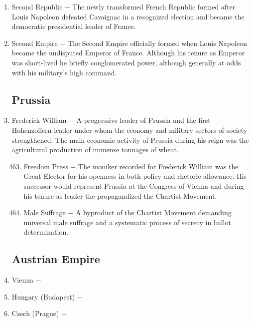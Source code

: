 \documentclass[12pt]{article}
\begin{document}
\begin{enumerate}
\item Second Republic $-$ The newly transformed French Republic formed after Louis Napoleon defeated Cavaignac in a recognized election and became the democratic presidential leader of France.

\item Second Empire $-$ The Second Empire officially formed when Louis Napoleon became the undisputed Emperor of France. Although his tenure as Emperor was short-lived he briefly conglomerated power, although generally at odds with his military's high command.

\subsection{Prussia}

\item Frederick William $-$ A progressive leader of Prussia and the first Hohenzollern leader under whom the economy and military sectors of society strengthened. The main economic activity of Prussia during his reign was the agricultural production of immense tonnages of wheat.

\begin{enumerate}[label=\arabic{*}.]
\setcounter{enumii}{462}

\item Freedom Press $-$ The moniker recorded for Frederick William was the Great Elector for his openness in both policy and rhetoric allowance. His successor would represent Prussia at the Congress of Vienna and during his tenure as leader the propagandized the Chartist Movement.

\item Male Suffrage $-$ A byproduct of the Chartist Movement demanding universal male suffrage and a systematic process of secrecy in ballot determination.

\end{enumerate}
\setcounter{enumi}{464}

\subsection{Austrian Empire}

\item Vienna $-$ 

\item Hungary (Budapest) $-$ 

\item Czech (Prague) $-$ 


\end{enumerate}
\end{document}
